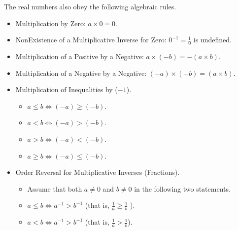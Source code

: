 \documentclass[letterpaper,10pt,english]{jupyterBook}
\begin{document}
\sphinxAtStartPar
The real numbers also obey the following algebraic rules.
\begin{itemize}
\item {} 
\sphinxAtStartPar
Multiplication by Zero: \(a \times 0 = 0\).

\item {} 
\sphinxAtStartPar
Non\sphinxhyphen{}Existence of a Multiplicative Inverse for Zero: \(0^{−1} = \frac{1}{0}\) is undefined.

\item {} 
\sphinxAtStartPar
Multiplication of a Positive by a Negative: \(a \times (−b) = −(a \times b)\).

\item {} 
\sphinxAtStartPar
Multiplication of a Negative by a Negative: \((−a) \times (−b) = (a \times b)\).

\item {} 
\sphinxAtStartPar
Multiplication of Inequalities by (\(−1\)).
\begin{itemize}
\item {} 
\sphinxAtStartPar
\(a \leqslant b \iff (−a) \geqslant (−b)\).

\item {} 
\sphinxAtStartPar
\(a < b \iff (−a) > (−b)\).

\item {} 
\sphinxAtStartPar
\(a > b \iff (−a) < (−b)\).

\item {} 
\sphinxAtStartPar
\(a \geqslant b \iff (−a) \leqslant (−b)\).

\end{itemize}

\item {} 
\sphinxAtStartPar
Order Reversal for Multiplicative Inverses (Fractions).
\begin{itemize}
\item {} 
\sphinxAtStartPar
Assume that both \(a \ne 0\) and \(b \ne 0\) in the following two statements.

\item {} 
\sphinxAtStartPar
\(a \leqslant b \iff a^{−1} > b^{−1}\) (that is, \(\frac{1}{a} \geqslant \frac{1}{b}\) ).

\item {} 
\sphinxAtStartPar
\(a < b \iff a^{−1} > b^{−1}\) (that is, \(\frac{1}{a} > \frac{1}{b}\)).

\end{itemize}

\end{itemize}
\end{document}
